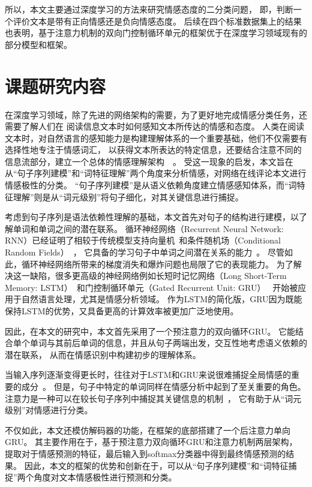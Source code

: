 所以，本文主要通过深度学习的方法来研究情感态度的二分类问题，
即，判断一个评价文本是带有正向情感还是负向情感态度。
后续在四个标准数据集上的结果也表明，基于注意力机制的双向门控制循环单元的框架优于在深度学习领域现有的部分模型和框架。

\section{课题研究内容}
在深度学习领域，除了先进的网络架构的需要，为了更好地完成情感分类任务，还需要了解人们在
阅读信息文本时如何感知文本所传达的情感和态度。
人类在阅读文本时，对自然语言的感知能力是构建理解体系的一个重要基础，他们不仅需要有选择性地专注于情感词汇，
以获得文本所表达的特定信息，还要结合注意不同的信息流部分，建立一个总体的情感理解架构~\upcite{}~。
受这一现象的启发，本文旨在从“句子序列建模”和“词特征理解”两个角度来分析情感，对网络在线评论本文进行情感极性的分类。
“句子序列建模”是从语义依赖角度建立情感感知体系，而“词特征理解”则是从“词元级别”将句子细化，对其关键信息进行捕捉。

考虑到句子序列是语法依赖性理解的基础，本文首先对句子的结构进行建模，以了解单词和单词之间的潜在联系。
循环神经网络（Recurrent Neural Network: RNN）已经证明了相较于传统模型支持向量机~和条件随机场（Conditional Random Fields）~，
它具备的学习句子中单词之间潜在关系的能力~。
尽管如此，循环神经网络所带来的梯度消失和爆炸问题也局限了它的表现能力。
为了解决这一缺陷，很多更高级的神经网络例如长短时记忆网络（Long Short-Term Memory: LSTM）~和门控制循环单元（Gated Recurrent Unit: GRU）~
开始被应用于自然语言处理，尤其是情感分析领域。
作为LSTM的简化版，GRU因为既能保持LSTM的优势，又具备更高的计算效率被更加广泛地使用。

因此，在本文的研究中，本文首先采用了一个预注意力的双向循环GRU。
它能结合单个单词与其前后单词的信息，并且从句子两端出发，交互性地考虑语义依赖的潜在联系，
从而在情感识别中构建初步的理解体系。

当输入序列逐渐变得更长时，往往对于LSTM和GRU来说很难捕捉全局情感的重要的成分~。
但是，句子中特定的单词同样在情感分析中起到了至关重要的角色。
注意力是一种可以在较长句子序列中捕捉其关键信息的机制~，
它有助于从“词元级别”对情感进行分类。

不仅如此，本文还模仿解码器的功能，在框架的底部搭建了一个后注意力单向GRU。
其主要作用在于，基于预注意力双向循环GRU和注意力机制两层架构，
提取对于情感预测的特征，最后输入到softmax分类器中得到最终情感预测的结果。
因此，本文的框架的优势和创新在于，可以从“句子序列建模”和“词特征捕捉”两个角度对文本情感极性进行预测和分类。

